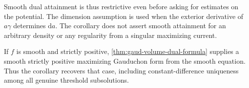 Smooth dual attainment is thus restrictive even before asking for estimates on the potential. The dimension assumption is used when the exterior derivative of $a\gamma$ determines $\mathrm{d}a$. The corollary does not assert smooth attainment for an arbitrary density or any regularity from a singular maximizing current.

If $f$ is smooth and strictly positive, \cref{thm:gaud-volume-dual-formula} supplies a smooth strictly positive maximizing Gauduchon form from the smooth equation. Thus the corollary recovers that case, including constant-difference uniqueness among all genuine threshold subsolutions.
